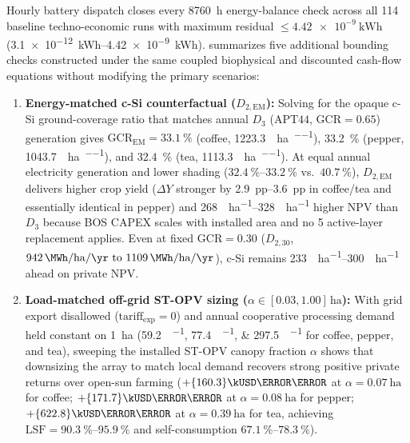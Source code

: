 \documentclass[preprint,12pt,a4paper]{elsarticle}
\begin{document}
Hourly battery dispatch closes every \qty{8760}{\hour} energy-balance check across all \num{114} baseline techno-economic runs with maximum residual $\le \qty{4.42e-9}{\kWh}$ (\qtyrange{3.1e-12}{4.42e-9}{\kWh}).  summarizes five additional bounding checks constructed under the same coupled biophysical and discounted cash-flow equations without modifying the primary scenarios:
\begin{enumerate}
 \item \textbf{Energy-matched c-Si counterfactual ($D_{2,\mathrm{EM}}$):} Solving for the opaque c-Si ground-coverage ratio that matches annual $D_3$ ($\mathrm{APT44}$, $\mathrm{GCR}=\num{0.65}$) generation gives $\mathrm{GCR}_{\mathrm{EM}} = \qty{33.1}{\percent}$ (coffee, \qty{1223.3}{\MWh\per\hectare\per\yr}), \qty{33.2}{\percent} (pepper, \qty{1043.7}{\MWh\per\hectare\per\yr}), and \qty{32.4}{\percent} (tea, \qty{1113.3}{\MWh\per\hectare\per\yr}). At equal annual electricity generation and lower shading ($\qtyrange{32.4}{33.2}{\percent}$ vs.\ $\qty{40.7}{\percent}$), $D_{2,\mathrm{EM}}$ delivers higher crop yield ($\Delta Y$ stronger by \qtyrange{+2.9}{+3.6}{pp} in coffee/tea and essentially identical in pepper) and \qtyrange{268}{328}{\kUSD\per\hectare} higher NPV than $D_3$ because BOS CAPEX scales with installed area and no \qty{5}{\yr} active-layer replacement applies. Even at fixed $\mathrm{GCR}=\num{0.30}$ ($D_{2,30}$, $\qtyrange{942}{1109}{\MWh\per\hectare\per\yr}$), c-Si remains \qtyrange{233}{300}{\kUSD\per\hectare} ahead on private NPV.
 \item \textbf{Load-matched off-grid ST-OPV sizing ($\alpha \in [\num{0.03}, \num{1.00}]\,\unit{\hectare}$):} With grid export disallowed ($\mathrm{tariff}_{\mathrm{exp}}=0$) and annual cooperative processing demand held constant on \qty{1}{\hectare} (\qtylist{59.2;77.4;297.5}{\MWh\per\yr} for coffee, pepper, and tea), sweeping the installed ST-OPV canopy fraction $\alpha$ shows that downsizing the array to match local demand recovers strong positive private returns over open-sun farming ($+\qty{160.3}{\kUSD\per\hectare}$ at $\alpha=\qty{0.07}{\hectare}$ for coffee; $+\qty{171.7}{\kUSD\per\hectare}$ at $\alpha=\qty{0.08}{\hectare}$ for pepper; $+\qty{622.8}{\kUSD\per\hectare}$ at $\alpha=\qty{0.39}{\hectare}$ for tea, achieving $\mathrm{LSF}=\qtyrange{90.3}{95.9}{\percent}$ and self-consumption $\qtyrange{67.1}{78.3}{\percent}$).

\end{enumerate}
\end{document}
